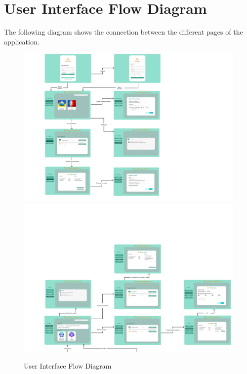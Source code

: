 \section{User Interface Flow Diagram}
The following diagram shows the connection between the different pages of the application. 
\begin{figure}[H]
    \centering
    \includegraphics[width=1\textwidth]{images/Interface_flow_diagram.jpg}
    \includegraphics[width=1\textwidth]{images/Interface_flow_diagram2.jpg}
    \caption{User Interface Flow Diagram}
\end{figure}